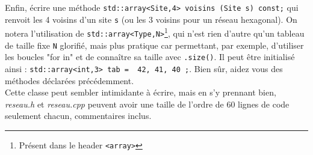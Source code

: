 \documentclass{book}
\newcommand{\inline}[1]{\texttt{#1}}
\def\filename{\emph}
\begin{document}
Enfin, écrire une méthode \inline{std::array<Site,4> voisins (Site s) const;} qui renvoit les 4 voisins d'un site \inline{s} (ou les 3 voisins pour un réseau hexagonal). On notera l'utilisation de \inline{std::array<Type,N>}\footnote{Présent dans le header \texttt{<array>}}, qui n'est rien d'autre qu'un tableau de taille fixe \inline{N} glorifié, mais plus pratique car permettant, par exemple, d'utiliser les boucles "for in" et de connaître sa taille avec \inline{.size()}. Il peut être initialisé ainsi : \inline{std::array<int,3> tab = { 42, 41, 40 };}. Bien sûr, aidez vous des méthodes déclarées précédemment.\\

Cette classe peut sembler intimidante à écrire, mais en s'y prennant bien, \filename{reseau.h} et \filename{reseau.cpp} peuvent avoir une taille de l'ordre de 60 lignes de code seulement chacun, commentaires inclus.
\end{document}
